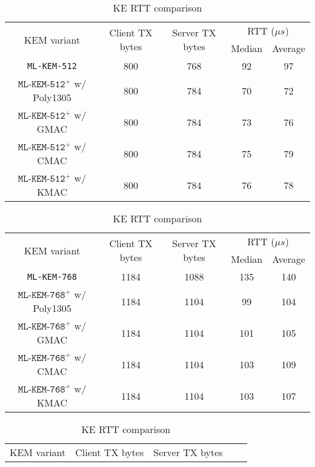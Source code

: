 \documentclass[journal=tches,submission]{iacrtrans}
\newcommand{\us}{\mu s}
\begin{document}
\begin{table}[h]
    \centering
    \footnotesize
    \caption{KE RTT comparison}\label{tbl:ke-rtt}

    \begin{tabular}{|c|c|c|c|c|}
        \hline
        \multirow{2}{*}{KEM variant}
        & \multirow{2}{*}{Client TX bytes}
        & \multirow{2}{*}{Server TX bytes}
        & \multicolumn{2}{|c|}{RTT ($\us$)} \\
        \cline{4-5}
        & & & Median & Average \\
        \hline
        \texttt{ML-KEM-512} & 800 & 768 & 92 & 97 \\
        \hline
        $\texttt{ML-KEM-512}^+$ w/ Poly1305 & 800 & 784 & 70 & 72 \\
        \hline
        $\texttt{ML-KEM-512}^+$ w/ GMAC & 800 & 784 & 73 & 76 \\
        \hline
        $\texttt{ML-KEM-512}^+$ w/ CMAC & 800 & 784 & 75 & 79 \\
        \hline
        $\texttt{ML-KEM-512}^+$ w/ KMAC & 800 & 784 & 76 & 78 \\
        \hline
    \end{tabular}\vspace{0.3cm}
    \begin{tabular}{|c|c|c|c|c|}
        \hline
        \multirow{2}{*}{KEM variant}
        & \multirow{2}{*}{Client TX bytes}
        & \multirow{2}{*}{Server TX bytes}
        & \multicolumn{2}{|c|}{RTT ($\us$)} \\
        \cline{4-5}
        & & & Median & Average \\
        \hline
        \texttt{ML-KEM-768} & 1184 & 1088 & 135 & 140 \\
        \hline
        $\texttt{ML-KEM-768}^+$ w/ Poly1305 & 1184 & 1104 & 99 & 104 \\
        \hline
        $\texttt{ML-KEM-768}^+$ w/ GMAC & 1184 & 1104 & 101 & 105 \\
        \hline
        $\texttt{ML-KEM-768}^+$ w/ CMAC & 1184 & 1104 & 103 & 109 \\
        \hline
        $\texttt{ML-KEM-768}^+$ w/ KMAC & 1184 & 1104 & 103 & 107 \\
        \hline
    \end{tabular}\vspace{0.3cm}
    \begin{tabular}{|c|c|c|c|c|}
        \hline
        \multirow{2}{*}{KEM variant}
        & \multirow{2}{*}{Client TX bytes}
        & \multirow{2}{*}{Server TX bytes}

\end{tabular}
\end{table}
\end{document}
